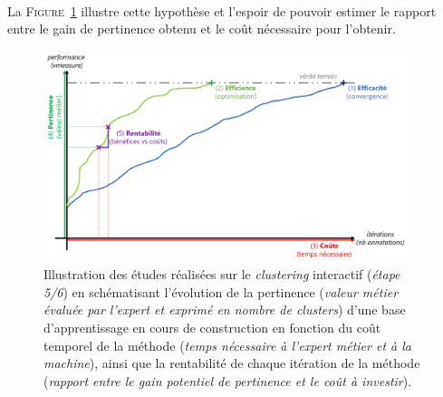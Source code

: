 	\begin{tcolorbox}[
		title=\faVial~\textbf{Hypothèse de rentabilité}~\faVial,
		colback=colorTcolorboxHypothesis!15,
		colframe=colorTcolorboxHypothesis!75,
		width=\linewidth
	]
		 \\
		
		La \textsc{Figure~\ref{figure:4.5-HYPOTHESE-RENTABILITE}} illustre cette hypothèse et l'espoir de pouvoir estimer le rapport entre le gain de pertinence obtenu et le coût nécessaire pour l'obtenir.
		\begin{figure}[H]  %
			\centering
			\includegraphics[width=0.95\textwidth]{figures/hypotheses-05-rentabilite}
			\caption{
				Illustration des études réalisées sur le \textit{clustering} interactif (\textit{étape 5/6}) en schématisant l'évolution de la pertinence (\textit{valeur métier évaluée par l'expert et exprimé en nombre de clusters}) d'une base d'apprentissage en cours de construction en fonction du coût temporel de la méthode (\textit{temps nécessaire à l'expert métier et à la machine}), ainsi que la rentabilité de chaque itération de la méthode (\textit{rapport entre le gain potentiel de pertinence et le coût à investir}).
			}
			\label{figure:4.5-HYPOTHESE-RENTABILITE}
		\end{figure}
	\end{tcolorbox}
		
